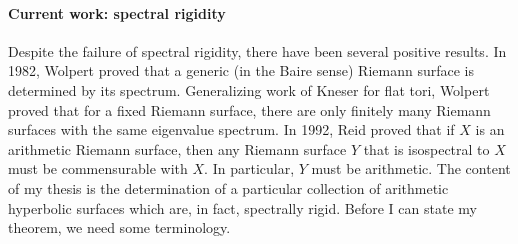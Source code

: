 \documentclass[11pt]{article}
\begin{document}
	
	\paragraph{Current work: spectral rigidity}
	Despite the failure of spectral rigidity, there have been several positive results. In 1982, Wolpert  \cite{wolpert1978}  proved that a generic (in the Baire sense) Riemann surface is determined by its spectrum. Generalizing work of Kneser for flat tori, Wolpert proved that for a fixed Riemann surface, there are only finitely many Riemann surfaces with the same eigenvalue spectrum. In 1992, Reid proved that if $X$ is an arithmetic Riemann surface, then any Riemann surface $Y$ that is isospectral to $X$ must be commensurable with $X$. In particular, $Y$ must be arithmetic. The content of my thesis is the determination of a particular collection of arithmetic  hyperbolic surfaces which are, in fact, spectrally rigid. Before I can state my theorem, we need some terminology. 
	
\end{document}
